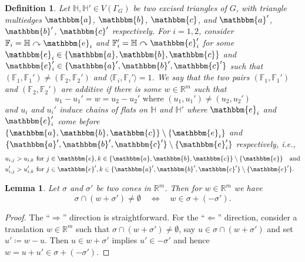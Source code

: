 \documentclass[11pt,reqno,a4paper]{amsart}
\theoremstyle{theoremstyle}
\newtheorem{lemma}[theorem]{Lemma}
\theoremstyle{examplestyle}
\newtheorem{definition}[theorem]{Definition}
\theoremstyle{algorithmstyle}
\renewcommand{\aa}{\mathbbm{a}}
\newcommand{\bb}{\mathbbm{b}}
\newcommand{\cc}{\mathbbm{c}}
\newcommand{\ee}{\mathbbm{e}}
\newcommand{\FF}{\mathbb{F}}
\newcommand{\HH}{\mathbb{H}}
\newcommand{\RR}{\mathbb{R}}
\begin{document}
\begin{definition}
  \label{def:additivePair}
  Let $\HH,\HH'\in V(\Gamma_G)$ be two excised triangles of $G$, with triangle multiedges $\aa$, $\bb$, $\cc$, and $\aa'$, $\bb'$, $\cc'$ respectively. For $i=1,2$, consider $\FF_i=\HH\curvearrowright\ee_i$ and $\FF_i'=\HH\curvearrowright\ee_i'$ for some $\ee_i\in \{\aa, \bb, \cc\}$ and $\ee_i'\in\{\aa', \bb', \cc'\}$ such that $(\FF_1,\FF_1') \neq (\FF_2,\FF_2')$ and $\langle \FF_i,\FF_i'\rangle=1$.  We say that the two pairs $(\FF_1,\FF_1')$ and $(\FF_2,\FF_2')$ are \emph{additive} if there is some $w\in\RR^m$ such that
  \begin{equation*}
    u_1 - u_1' = w = u_2 - u_2' \text{ where } (u_1, u_1') \neq (u_2, u_2')
  \end{equation*}
  and $u_i$ and $u_i'$ induce chains of flats on $\HH$ and $\HH'$ where $\ee_i$ and $\ee_i'$ come before $\{\aa, \bb, \cc\} \setminus \{\ee_i\}$ and $\{\aa', \bb', \cc'\} \setminus \{\ee_i'\}$ respectively, i.e.,
  \begin{align*}
    &u_{i,j}>u_{i,k} \text{ for } j\in \ee, k\in \{\aa, \bb, \cc\} \setminus \{\ee\} \quad \text{and}\\
    &u_{i,j}'>u_{i,k}' \text{ for } j\in \ee', k\in \{\aa', \bb', \cc'\} \setminus \{\ee'\}.
  \end{align*}
\end{definition}

\begin{lemma}
  \label{lem:coneShift}
  Let $\sigma$ and $\sigma'$ be two cones in $\RR^m$.  Then for $w\in\RR^m$ we have
  \begin{equation*}
    \sigma \cap (w + \sigma') \neq \emptyset \quad \iff \quad w \in \sigma + (-\sigma').
  \end{equation*}
\end{lemma}
\begin{proof}
  The ``$\Rightarrow$'' direction is straightforward.  For the ``$\Leftarrow$'' direction, consider a translation $w\in\RR^m$ such that $\sigma \cap (w + \sigma') \neq \emptyset$, say $u\in \sigma \cap (w + \sigma')$ and set $u'\coloneqq w-u$.  Then $u\in w+\sigma'$ implies $u'\in -\sigma'$ and hence $w=u+u'\in\sigma+(-\sigma')$.
\end{proof}
\end{document}
